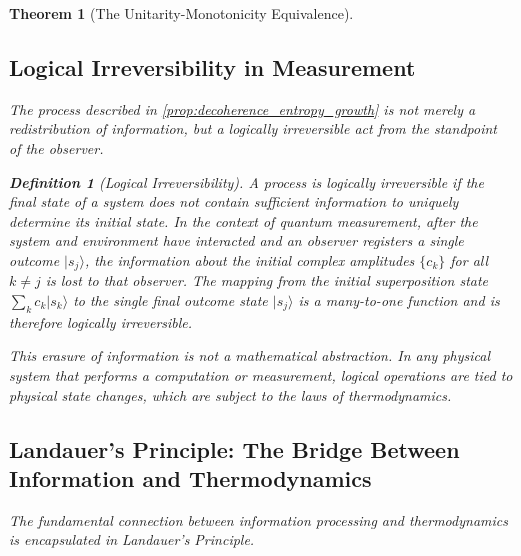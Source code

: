 \documentclass[11pt, letterpaper]{report}
\theoremstyle{plain} %
\newtheorem{theorem}{Theorem}[chapter]
\theoremstyle{definition} %
\newtheorem{definition}{Definition}[chapter]
\theoremstyle{remark} %
\begin{document}
\begin{theorem}[The Unitarity-Monotonicity Equivalence]
\subsection{Logical Irreversibility in Measurement}
The process described in \cref{prop:decoherence_entropy_growth} is not merely a redistribution of information, but a logically irreversible act from the standpoint of the observer.

\begin{definition}[Logical Irreversibility]
A process is logically irreversible if the final state of a system does not contain sufficient information to uniquely determine its initial state. In the context of quantum measurement, after the system and environment have interacted and an observer registers a single outcome $|s_j\rangle$, the information about the initial complex amplitudes $\{c_k\}$ for all $k \neq j$ is lost to that observer. The mapping from the initial superposition state $\sum_k c_k |s_k\rangle$ to the single final outcome state $|s_j\rangle$ is a many-to-one function and is therefore logically irreversible.
\end{definition}

This erasure of information is not a mathematical abstraction. In any physical system that performs a computation or measurement, logical operations are tied to physical state changes, which are subject to the laws of thermodynamics.

\subsection{Landauer's Principle: The Bridge Between Information and Thermodynamics}
The fundamental connection between information processing and thermodynamics is encapsulated in Landauer's Principle.


\end{theorem}
\end{document}

